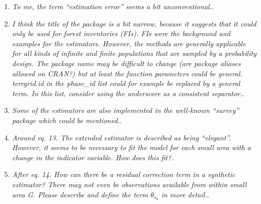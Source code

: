 \documentclass{article}
\begin{document}
\begin{enumerate}
\item \textit{To me, the term “estimation error” seems a bit unconventional.}.

\answerfin{}

\item \textit{I think the title of the package is a bit narrow, because it suggests that it could only be used for forest inventories (FIs). FIs were the background and examples for the estimators. However, the methods are generally applicable for all kinds of infinite and finite populations that are sampled by a probability design. The package name may be difficult to change (are package aliases allowed on CRAN?) but at least the function parameters could be general. terrgrid.id in the phase\_id list could for example be replaced by a general term. In this list, consider using the underscore as a consistent separator.}.


\item \textit{Some of the estimators are also implemented in the well-known “survey” package which could be mentioned.}.


\item \textit{Around eq. 13. The extended estimator is described as being “elegant”. However, it seems to be necessary to fit the model for each small area with a change in the indicator variable. How does this fit?}.


\item \textit{After eq. 14. How can there be a residual correction term in a synthetic estimator? There may not even be observations available from within small area G. Please describe and define the term $\theta_{s_2}$ in more detail.}.


\end{enumerate}
\end{document}
